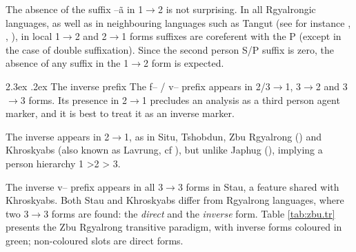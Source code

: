 \documentclass[oldfontcommands,twoside,usletter,12pt]{memoir}
\makeatletter
\newcommand{\ipa}[1]{{\phon #1}} %
\renewcommand{\subsection}{\@startsection{subsection}{1}{\z@}
                                   {-2.5ex \@plus -1ex \@minus -.2ex}%
                                   {2.3ex \@plus.2ex}%
								{\flushleft\large\itshape} }
\makeatother
\begin{document}
The absence of the suffix  \ipa{--ã}  in 1$\rightarrow$2 is not surprising. In all Rgyalrongic languages, as well as in neighbouring languages such as Tangut (see for instance \citealt[18]{jacques09tangutverb}, \citealt{gongxun14agreement}, \citealt{lai14person}), in local 1$\rightarrow$2 and 2$\rightarrow$1 forms suffixes are coreferent with the P (except in the case of double suffixation). Since the second person S/P suffix is zero, the absence of any suffix in the 1$\rightarrow$2 form is expected.

%
\subsection{The inverse prefix}
The \ipa{f}-- / \ipa{v}-- prefix appears in 2/3$\rightarrow$1, 3$\rightarrow$2 and 3$\rightarrow$3 forms. Its presence  in 2$\rightarrow$1 precludes an analysis as a third person agent marker, and it is best to treat it as an inverse marker.

The inverse appears in 2$\rightarrow$1, as in Situ, Tshobdun, Zbu Rgyalrong (\citealt{delancey81direction, jackson02rentongdengdi, gongxun14agreement}) and Khroskyabs (also known as Lavrung, cf \citealt{lai13affixale}), but unlike Japhug (\citealt{jacques10inverse}), implying a person hierarchy  1 >2 > 3. 



The inverse \ipa{v}-- prefix appears in all 3$\rightarrow$3 forms in Stau, a feature shared with Khroskyabs. Both Stau and Khroskyabs differ from Rgyalrong languages, where two 3$\rightarrow$3 forms are found: the \textit{direct}   and the \textit{inverse} form. Table \ref{tab:zbu.tr} presents the Zbu Rgyalrong transitive paradigm, with inverse forms coloured in green; non-coloured slots are direct forms.
\end{document}
